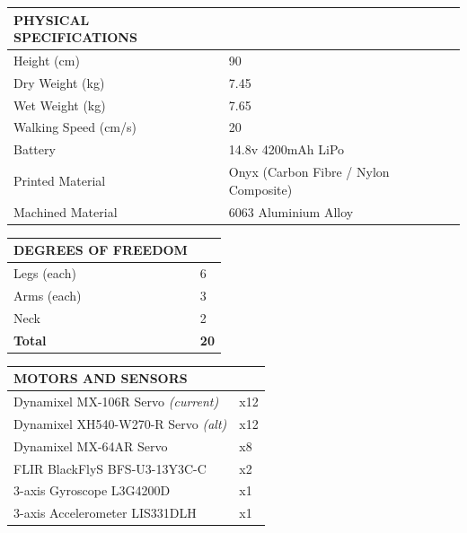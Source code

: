 \documentclass[10pt,a4paper]{article}
\begin{document}
\begin{multicols}{2}
\begin{table}[H]
	\begin{tabular}{|m{4cm}|m{2.8cm}|}
		\hline
		\rowcolor[rgb]{0.0, 0.0, 0.0}
		{\color{textcolour}\textbf{{PHYSICAL SPECIFICATIONS}}} & \\
		\hline
		Height (cm) & 90 \\
		\hline
		Dry Weight (kg) & 7.45 \\
		\hline
		Wet Weight (kg) & 7.65 \\
		\hline
		Walking Speed (cm/s) & 20 \\
		\hline
		Battery & 14.8v 4200mAh LiPo \\
		\hline
		Printed Material & Onyx (Carbon Fibre / Nylon Composite) \\
		\hline
		Machined Material & 6063 Aluminium Alloy \\
		\hline		
	\end{tabular}
\end{table}

\begin{table}[H]
	\begin{tabular}{|m{5.9cm}|m{1.25cm}|}
		\hline
		\rowcolor[rgb]{0.0, 0.0, 0.0}
		{\color{textcolour}\textbf{{DEGREES OF FREEDOM}}} & \\
		\hline
		Legs (each) & 6 \\
		\hline
		Arms (each) & 3 \\
		\hline
		Neck & 2 \\
		\hline
		\textbf{Total} & \textbf{20} \\
		\hline
	\end{tabular}
\end{table}

\begin{table}[H]
	\begin{tabular}{|m{5.9cm}|m{1.25cm}|}
		\hline
		\rowcolor[rgb]{0.0, 0.0, 0.0}
		{\color{textcolour}\textbf{{MOTORS AND SENSORS}}} & \\
		\hline
		Dynamixel MX-106R Servo \textit{(current)} & x12 \\
		\hline
        Dynamixel XH540-W270-R Servo \textit{(alt)} & x12 \\
		\hline
		Dynamixel MX-64AR Servo & x8 \\
		\hline
		FLIR BlackFlyS BFS-U3-13Y3C-C & x2 \\
		\hline
		3-axis Gyroscope L3G4200D & x1 \\
		\hline  
		3-axis Accelerometer LIS331DLH & x1 \\
		\hline
	\end{tabular}
\end{table}


\end{multicols}
\end{document}
